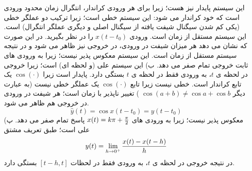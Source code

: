 \documentclass[10pt,letterpaper]{article}
\newcommand{\nl}{\newline\newline}
\begin{document}
این سیستم پایدار نیز هست؛ زیرا برای هر ورودی کراندار، انتگرال زمان محدود ورودی است که خود کراندار می شود:
این سیستم خطی است؛ زیرا ترکیب دو عملگر خطی (یکی کم شدن سیگنال شیفت یافته از سیگنال اصلی و دیگری عملگر انتگرال) است.
\nl
این سیستم مستقل از زمان است. ورودی $x(t-t_0)$ را در نظر بگیرید. در این صورت
که نشان می دهد هر میزان شیفت در ورودی، در خروجی نیز ظاهر می شود و در نتیجه سیستم مستقل از زمان است.
\nl
این سیستم معکوس پذیر نیست؛ زیرا به ورودی های ثابت خروجی تمام صفر می دهد.
\nl
ب) این سیستم علی (و لحظه ای) است؛ زیرا خروجی در لحظه ی $t$، به ورودی فقط در لحظه ی $t$ بستگی دارد.
\nl
پایدار است زیرا 
$
\cos(\cdot)
$
 یک تابع کراندار است.
\nl
خطی نیست زیرا تابع
$
\cos(\cdot)
$
 یک عملگر خطی نیست (به عبارت دیگر
$
\cos(a+b)\ne \cos a+\cos b
$
)
 \nl
تغییر ناپذیر با زمان است؛ هر شیفت در ورودی در خروجی هم ظاهر می شود.
$$
\hat y(t)=\cos x(t-t_0)=y(t-t_0)
$$
معکوس پذیر نیست؛ زیرا به ورودی های 
$
x(t)=k\pi +{\pi\over 2}
$
 پاسخ تمام صفر می دهد.
\nl
پ) علی است؛ طبق تعریف مشتق
$$
y(t)=\lim_{h\to 0^+} {x(t)-x(t-h)\over h}
$$
در نتیجه خروجی در لحظه ی $t$، به ورودی فقط در لحظات 
$
[t-h,t]
$
 بستگی دارد.
\end{document}
